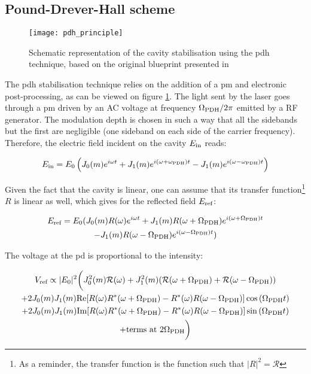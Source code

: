 
\subsection{Pound-Drever-Hall scheme}

\begin{figure}
	\centering
	\texttt{[image: pdh\_principle]}
	\caption{Schematic representation of the cavity stabilisation using the \gls{pdh} technique, based on the original blueprint presented in \cite{drever1983laser}}
	\label{pdh_principle}
\end{figure}

The \gls{pdh} stabilisation technique relies on the addition of a \gls{pm} and electronic post-processing, as can be viewed on figure \ref{pdh_principle}. The light sent by the laser goes through a \gls{pm} driven by an AC voltage at frequency $\Omega_{\text{PDH}}/2\pi$ emitted by a RF generator. The modulation depth is chosen in such a way that all the sidebands but the first are negligible (one sideband on each side of the carrier frequency). Therefore, the electric field incident on the cavity $E_{\text{in}}$ reads:

\begin{equation}
	E_{\text{in}} = E_0 \left(J_0(m) e^{i\omega t} + J_1(m)e^{i(\omega +\omega_{\text{PDH}})t} - J_1(m)e^{i(\omega -\omega_{\text{PDH}})t}  \right)
\end{equation}

Given the fact that the cavity is linear, one can assume that its transfer function\footnote{As a reminder, the transfer function is the function such that $|R|^2=\mathcal{R}$} $R$ is linear as well, which gives for the reflected field $E_{\text{ref}}$:

\begin{gather}
	E_{\text{ref}} = E_0 ( J_0(m) R(\omega) e^{i \omega t} + J_1(m) R(\omega+\Omega_{\text{PDH}}) e^{i (\omega+\Omega_{\text{PDH}}) t} \nonumber \\
	- J_1(m) R(\omega-\Omega_{\text{PDH}}) e^{i (\omega-\Omega_{\text{PDH}}) t} )
\end{gather}

The voltage at the \gls{pd} is proportional to the intensity:

\begin{gather}
	V_{\text{ref}} \propto |E_0|^2 \bigg( J_0^2(m) \mathcal{R}(\omega) + J_1^2(m) (\mathcal{R}(\omega+\Omega_{\text{PDH}}) + \mathcal{R}(\omega-\Omega_{\text{PDH}})) \nonumber \\
	+ 2 J_0(m)J_1(m) \text{Re}[R(\omega)R^*(\omega+\Omega_{\text{PDH}})-R^*(\omega)R(\omega-\Omega_{\text{PDH}})] \cos{(\Omega_{\text{PDH}} t)} \nonumber \\
	+ 2 J_0(m)J_1(m) \text{Im}[R(\omega)R^*(\omega+\Omega_{\text{PDH}})-R^*(\omega)R(\omega-\Omega_{\text{PDH}})] \sin{(\Omega_{\text{PDH}} t)} \nonumber \\
	+ \text{terms at } 2\Omega_{\text{PDH}} \bigg)
\end{gather}

